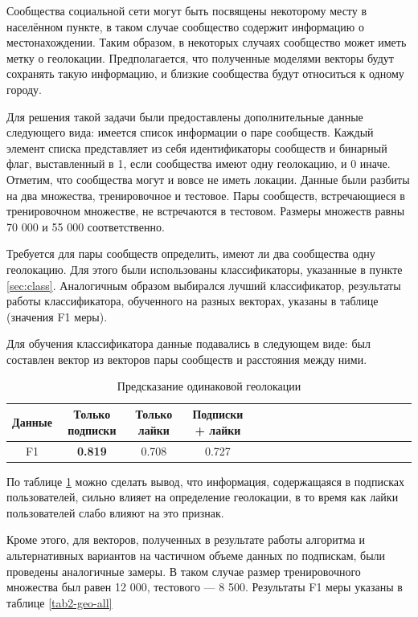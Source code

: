 \documentclass[times,specification,annotation]{itmo-student-thesis}
\begin{document}
Сообщества социальной сети могут быть посвящены некоторому месту в населённом пункте, в таком случае сообщество содержит информацию о местонахождении. Таким образом, в некоторых случаях сообщество может иметь метку о геолокации. Предполагается, что полученные моделями векторы будут сохранять такую информацию, и близкие сообщества будут относиться к одному городу. 

Для решения такой задачи были предоставлены дополнительные данные следующего вида: имеется список информации о паре сообществ. Каждый элемент списка представляет из себя идентификаторы сообществ и бинарный флаг, выставленный в 1, если сообщества имеют одну геолокацию, и 0 иначе. Отметим, что сообщества могут и вовсе не иметь локации. Данные были разбиты на два множества, тренировочное и тестовое. Пары сообществ, встречающиеся в тренировочном множестве, не встречаются в тестовом. Размеры множеств равны 70 000 и 55 000 соответственно.

Требуется для пары сообществ определить, имеют ли два сообщества одну геолокацию. Для этого были использованы классификаторы, указанные в пункте \ref{sec:class}. Аналогичным образом выбирался лучший классификатор, результаты работы классификатора, обученного на разных векторах, указаны в таблице (значения F1 меры). 

Для обучения классификатора данные подавались в следующем виде: был составлен вектор из векторов пары сообществ и расстояния между ними. 

\begin{table}[!h]
\caption{Предсказание одинаковой геолокации} \label{tab2-geo-cmp}
\centering
\begin{tabular}{|*{18}{c|}}\hline
Данные  & Только подписки  & Только лайки & Подписки + лайки \\\hline
F1                        & \textbf{0.819} & 0.708  & 0.727 \\\hline
\end{tabular}
\end{table}

По таблице \ref {tab2-geo-cmp} можно сделать вывод, что информация, содержащаяся в подписках пользователей, сильно влияет на определение геолокации, в то время как лайки пользователей слабо влияют на это признак. 

Кроме этого, для векторов, полученных в результате работы алгоритма и альтернативных вариантов на частичном объеме данных по подпискам, были проведены аналогичные замеры. В таком случае размер тренировочного множества был равен 12 000, тестового --- 8 500. Результаты F1 меры указаны в таблице \ref{tab2-geo-all}
\end{document}
